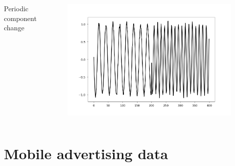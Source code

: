 \documentclass[intlimits, 9pt, unicode]{beamer}
\begin{document}
\begin{frame}
\begin{columns}
\begin{column}{0.5\textwidth}
  \begin{columns}
      \begin{column}{0.3\textwidth}
      \centering
      Periodic component change
      \end{column}
      \begin{column}{0.5\textwidth}
      \begin{figure}
		\includegraphics[scale=0.08]{images/examples_periodic}
	\end{figure}
	\end{column}
     \end{columns}

	\end{column}
	
     \end{columns}
     
\end{frame}


\section{Mobile advertising data}
\end{document}
